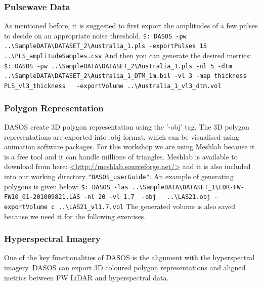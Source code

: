 \documentclass{subfiles}
\begin{document}
		\subsubsection{Pulsewave Data}
		As mentioned before, it is suggested to first export the amplitudes of a few pulses to decide on an appropriate noise threshold.\newline
		\verb|$: DASOS -pw ..\SampleDATA\DATASET_2\Australia_1.pls -exportPulses 15 |\newline \verb|   ..\PLS_amplitudeSamples.csv|
		\newline\newline
		And then you can generate the desired metrics:\newline
		\verb|$: DASOS -pw ..\SampleDATA\DATASET_2\Australia_1.pls -nl 5 -dtm |\newline \verb|   ..\SampleDATA\DATASET_2\Australia_1_DTM_1m.bil -vl 3 -map thickness |\newline \verb| PLS_vl3_thickness   -exportVolume ..\Australia_1_vl3_dtm.vol|\newline
		
		\subsubsection{Polygon Representation}
		DASOS create 3D polygon representation using the '-obj' tag. The 3D polygon representations are exported into .obj format, which can be visualised using animation software packages. For this workshop we are using Meshlab because it is a free tool and it can handle millions of triangles.\newline
		Meshlab is available to download from here: \url{<http://meshlab.sourceforge.net/>} and it is also included into our working directory \verb|"DASOS_userGuide"|.\newline
		An example of generating polygons is given below:\newline
		\verb|$: DASOS -las ..\SampleDATA\DATASET_1\LDR-FW-FW10_01-201009821.LAS -nl 20|\newline \verb| -vl 1.7  -obj   ..\LAS21.obj -exportVolume c ..\LAS21_vl1.7.vol|\newline
		The generated volume is also saved because we need it for the following exercises. 
		
		
	    \subsubsection{Hyperspectral Imagery}
	    \par One of the key functionalities of DASOS is the alignment with the hyperspectral imagery. DASOS can export 3D coloured polygon representations and aligned metrics between FW LiDAR and hyperspectral data. 
	    
\end{document}
